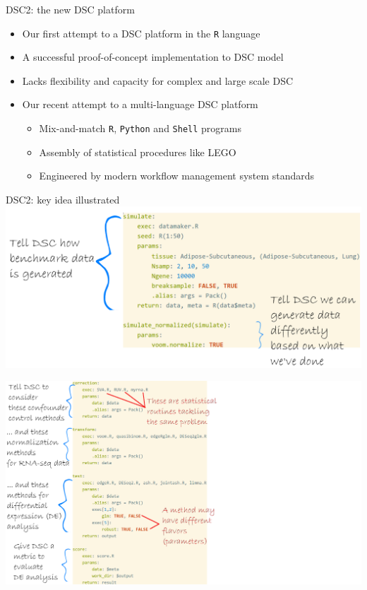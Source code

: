 \begin{frame}{DSC2: the new DSC platform}
  \dscr
\begin{itemize}
  \item Our first attempt to a DSC platform in the \texttt{R} language
  \item A successful proof-of-concept implementation to DSC model
  \item Lacks flexibility and capacity for complex and large scale DSC 
\end{itemize}
\bigskip
  \dscii
\begin{itemize}
  \item Our recent attempt to a multi-language DSC platform 
    \begin{itemize}
      \item Mix-and-match \texttt{R}, \texttt{Python} and \texttt{Shell} programs 
      \item Assembly of statistical procedures like LEGO 
      \item Engineered by modern workflow management system standards
     \end{itemize}
\end{itemize}
\end{frame}
\begin{frame}{DSC2: key idea illustrated}
  \centering \includegraphics[width=\textwidth]{figs/1}
\end{frame}
\begin{withoutheadline}
\begin{frame}[fragile]
  \centering \includegraphics[height=\textheight]{figs/2}
\end{frame}
\end{withoutheadline}
